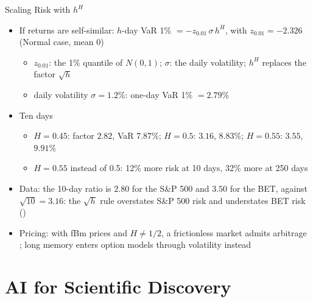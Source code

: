 \begin{frame}{Scaling Risk with $h^H$}
\itemsize{\footnotesize}
\begin{itemize}
    \item If returns are self-similar: $h$-day VaR 1\% $= -z_{0.01}\,\sigma\,h^H$, with $z_{0.01} = -2.326$ (Normal case, mean 0)
    \begin{itemize}
        \item $z_{0.01}$: the 1\% quantile of $N(0,1)$; $\sigma$: the daily volatility; $h^H$ replaces the factor $\sqrt{h}$
        \item daily volatility $\sigma = 1.2\%$: one-day VaR 1\% $= 2.79\%$
    \end{itemize}
    \item Ten days
    \begin{itemize}
        \item $H = 0.45$: factor $2.82$, VaR $7.87\%$; $H = 0.5$: $3.16$, $8.83\%$; $H = 0.55$: $3.55$, $9.91\%$
        \item $H = 0.55$ instead of 0.5: 12\% more risk at 10 days, 32\% more at 250 days
    \end{itemize}
    \item Data: the 10-day ratio is $2.80$ for the S\&P 500 and $3.50$ for the BET, against $\sqrt{10} = 3.16$: the $\sqrt{h}$ rule overstates S\&P 500 risk and understates BET risk ()
    \item Pricing: with fBm prices and $H \neq 1/2$, a frictionless market admits arbitrage ; long memory enters option models through volatility instead
\end{itemize}
\end{frame}


\section{AI for Scientific Discovery}

